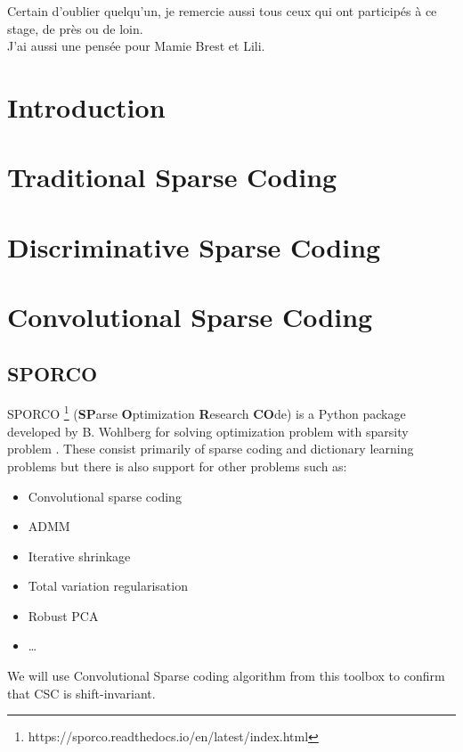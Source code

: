 \documentclass[a4paper,10pt]{report}
\begin{document}
Certain d'oublier quelqu'un, je remercie aussi tous ceux qui ont participés à ce stage, de près ou de loin.\\

\vspace{10cm}\hspace{7cm} J'ai aussi une pensée pour Mamie Brest et Lili.
\newpage
\tableofcontents

\chapter{Introduction}


\label{chap:Introduction}

\newpage
\chapter{Traditional Sparse Coding}
\label{chap:SparseCoding}



\newpage

%
%

\newpage
\chapter{Discriminative Sparse Coding }
\label{chap:Discriminative}


%

\newpage

%
\newpage
\chapter{Convolutional Sparse Coding}
\label{chap:Conv}


\section{SPORCO}
SPORCO \footnote{https://sporco.readthedocs.io/en/latest/index.html} (\textbf{SP}arse \textbf{O}ptimization \textbf{R}esearch \textbf{CO}de) is a Python package developed by  B. Wohlberg for solving optimization problem with sparsity problem  \cite{wohlberg-2017-sporco, wohlberg-2016-sporco}. These consist primarily of sparse coding and dictionary learning problems but there is also support for other problems such as:
\begin{itemize}
 \item Convolutional sparse coding
 \item ADMM
 \item Iterative shrinkage
 \item Total variation regularisation
 \item Robust PCA
 \item \dots
\end{itemize}
We will use Convolutional Sparse coding algorithm from this toolbox to confirm that CSC is shift-invariant.
\newpage
%
\newpage

\newpage
\end{document}
